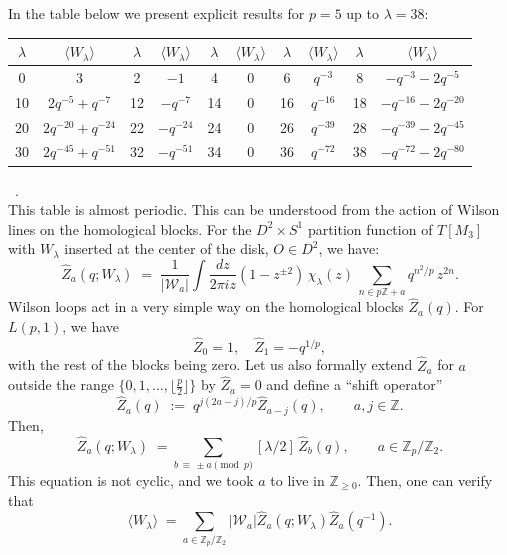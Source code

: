 \documentclass[hyper,letterpaper]{JHEP3}
\newcommand{\be}{\begin{equation}}
\newcommand{\ee}{\end{equation}}
\newcommand{\Z}{{\mathbb Z}}
\renewcommand{\hat}{\widehat}
\def\CW{{\mathcal W}}
\begin{document}
In the table below we present explicit results for $p=5$ up to $\lambda=38$:
\vspace{0.2cm}
\\
\vspace{0.2cm}
\begin{tabular}{|c|c||c|c||c|c||c|c||c|c|}\hline
$\lambda$ & $\langle W_\lambda\rangle$ & $\lambda$ & $\langle W_\lambda\rangle$ &$\lambda$ & $\langle W_\lambda\rangle$&$\lambda$ & $\langle W_\lambda\rangle$  &$\lambda$ & $\langle W_\lambda\rangle$\\ \hline
0 & 3 & 2 & $-1$ &4 & 0 & 6 &$q^{-3}$ & 8 & $-q^{-3}-2q^{-5}$ \\ \hline
10 & $2q^{-5}+q^{-7}$ & 12 &$-q^{-7} $ &14& 0 &16& $q^{-16}$ &18& $-q^{-16}-2q^{-20}$ \\ \hline
20 & $2q^{-20}+q^{-24}$ & 22 & $-q^{-24}$ &24& 0 &26& $q^{-39}$ &28& $-q^{-39}-2q^{-45}$ \\ \hline
30 & $2q^{-45}+q^{-51}$ & 32 & $-q^{-51}$ &34& 0 &36& $q^{-72}$ &38& $-q^{-72}-2q^{-80}$ \\ \hline
\end{tabular}\ .
\\
This table is almost periodic. This can be understood from the action of Wilson lines on the homological blocks.
For the $D^2\times S^1$ partition function of $T[M_3]$ with $W_\lambda$ inserted at the center of the disk, $O \in D^2$, we have:
\begin{equation}
	\hat{Z}_a(q;W_\lambda) \; = \; \frac{1}{|\CW_a|}\int\frac{dz}{2\pi i z}
	(1-z^{\pm 2})\,\chi_{\lambda}(z)\,\sum_{n\in p\Z+a}q^{n^2/p}\,z^{2n}.
	\label{block-Lp1-knot}
\end{equation}
Wilson loops act in a very simple way on the homological blocks $\hat{Z}_a(q)$. For $L(p,1)$, we have
\be
\hat{Z}_0=1,\quad \hat{Z}_1=-q^{1/p},
\ee
with the rest of the blocks being zero. Let us also formally extend $\hat{Z}_a$ for $a$ outside the range $\{0,1,\ldots,\lfloor\frac{p}{2}\rfloor\}$ by $\hat{Z}_a=0$ and define a ``shift operator''
\begin{equation}
 [j]\hat{Z}_a(q) \; := \; q^{j(2a-j)/p}\hat{Z}_{a-j}(q),\qquad a,j\in \Z.
\end{equation}
Then,
\be
\hat{Z}_a(q;W_{\lambda}) \; =  \sum_{b \, \equiv \, \pm a \pmod p}[\lambda/2] \, \hat{Z}_b(q) ,\qquad a\in \Z_p/\Z_2.
\ee
This equation is not cyclic, and we took $a$ to live in $\Z_{\ge 0}$. Then, one can verify that
\be
\langle W_\lambda \rangle \; = \sum_{a\in \Z_p/\Z_2}|\CW_a|\hat{Z}_a(q;W_\lambda)\hat{Z}_a(q^{-1}).
\ee
\end{document}
